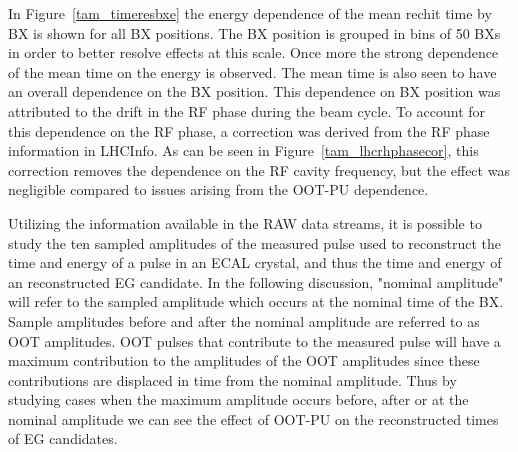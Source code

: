 In Figure~\ref{tam_timeresbxe} the energy dependence of the mean rechit time by BX is shown for all BX positions. The BX position is grouped in bins of 50 BXs in order to better resolve effects at this scale. Once more the strong dependence of the mean time on the energy is observed. The mean time is also seen to have an overall dependence on the BX position. This dependence on BX position was attributed to the drift in the RF phase during the beam cycle. To account for this dependence on the RF phase, a correction was derived from the RF phase information in LHCInfo. As can be seen in Figure~\ref{tam_lhcrhphasecor}, this correction removes the dependence on the RF cavity frequency, but the effect was negligible compared to issues arising from the OOT-PU dependence.


Utilizing the information available in the RAW data streams, it is possible to study the ten sampled amplitudes of the measured pulse used to reconstruct the time and energy of a pulse in an ECAL crystal, and thus the time and energy of an reconstructed EG candidate. In the following discussion, "nominal amplitude" will refer to the sampled amplitude which occurs at the nominal time of the BX. Sample amplitudes before and after the nominal amplitude are referred to as OOT amplitudes. OOT pulses that contribute to the measured pulse will have a maximum contribution to the amplitudes of the OOT amplitudes since these contributions are displaced in time from the nominal amplitude. Thus by studying cases when the maximum amplitude occurs before, after or at the nominal amplitude we can see the effect of OOT-PU on the reconstructed times of EG candidates. 

